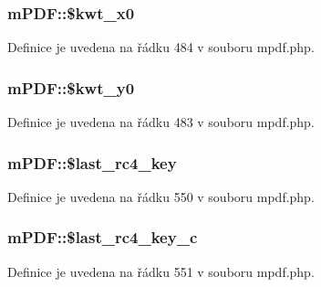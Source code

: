 \hypertarget{classm_p_d_f_aa6ce440cef3bd5140410df8e6785b10c}{
\subsubsection[{\$kwt\-\_\-x0}]{\setlength{\rightskip}{0pt plus 5cm}m\-P\-D\-F\-::\$kwt\-\_\-x0}}\label{classm_p_d_f_aa6ce440cef3bd5140410df8e6785b10c}


Definice je uvedena na řádku 484 v souboru mpdf.\-php.

\hypertarget{classm_p_d_f_ac297b3200a107c49ad340b594b30acd7}{
\subsubsection[{\$kwt\-\_\-y0}]{\setlength{\rightskip}{0pt plus 5cm}m\-P\-D\-F\-::\$kwt\-\_\-y0}}\label{classm_p_d_f_ac297b3200a107c49ad340b594b30acd7}


Definice je uvedena na řádku 483 v souboru mpdf.\-php.

\hypertarget{classm_p_d_f_a415bc2290864597092510d0aaa1c5d11}{
\subsubsection[{\$last\-\_\-rc4\-\_\-key}]{\setlength{\rightskip}{0pt plus 5cm}m\-P\-D\-F\-::\$last\-\_\-rc4\-\_\-key}}\label{classm_p_d_f_a415bc2290864597092510d0aaa1c5d11}


Definice je uvedena na řádku 550 v souboru mpdf.\-php.

\hypertarget{classm_p_d_f_aef4cce15bc26306cf509f8c969adec0f}{
\subsubsection[{\$last\-\_\-rc4\-\_\-key\-\_\-c}]{\setlength{\rightskip}{0pt plus 5cm}m\-P\-D\-F\-::\$last\-\_\-rc4\-\_\-key\-\_\-c}}\label{classm_p_d_f_aef4cce15bc26306cf509f8c969adec0f}


Definice je uvedena na řádku 551 v souboru mpdf.\-php.

